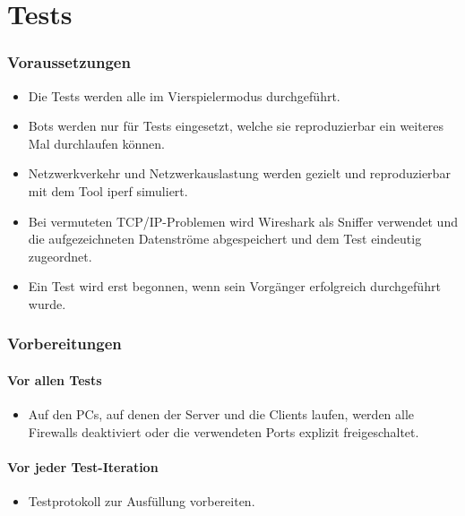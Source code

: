 \documentclass[12pt,halfparskip]{scrartcl}
\begin{document}

\section{Tests}\label{sec:tests}
\subsubsection{Voraussetzungen}
\begin{itemize}
	\item Die Tests werden alle im Vierspielermodus durchgeführt.
	\item Bots werden nur für Tests eingesetzt, welche sie reproduzierbar ein weiteres Mal durchlaufen können.
	\item Netzwerkverkehr und Netzwerkauslastung werden gezielt und reproduzierbar mit dem Tool iperf simuliert.
	\item Bei vermuteten TCP/IP-Problemen wird Wireshark als Sniffer verwendet und die aufgezeichneten Datenströme abgespeichert und dem Test eindeutig zugeordnet.
	\item Ein Test wird erst begonnen, wenn sein Vorgänger erfolgreich durchgeführt wurde.
\end{itemize}

\subsubsection{Vorbereitungen}
\paragraph{Vor allen Tests}\label{ssub:vorbereitungen_vor_allen_tests} 
	\begin{itemize}
		\item Auf den PCs, auf denen der Server und die Clients laufen, werden alle Firewalls deaktiviert oder die verwendeten Ports explizit freigeschaltet.
	\end{itemize}

\paragraph{Vor jeder Test-Iteration}\label{ssub:vorbereitungen_vor_jeder_testiteration}
	\begin{itemize}
		\item Testprotokoll zur Ausfüllung vorbereiten.
	\end{itemize}
\end{document}
